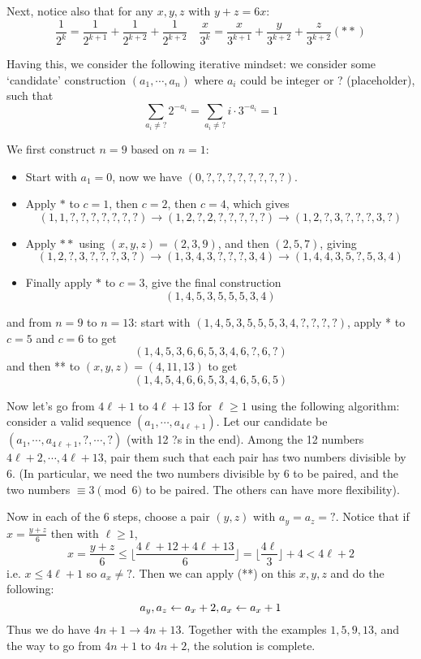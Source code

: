 \documentclass[11pt,a4paper]{article}
\begin{document}
\begin{enumerate}
    Next, notice also that for any $x, y, z$ with $y+z=6x$: 
    \[
    \frac{1}{2^{k}}=\frac{1}{2^{k+1}}+\frac{1}{2^{k+2}}+\frac{1}{2^{k+2}}
    \quad 
    \frac{x}{3^{k}}=\frac{x}{3^{k+1}}+\frac{y}{3^{k+2}}+\frac{z}{3^{k+2}} (**)
    \]
   
    Having this, we consider the following iterative mindset: 
    we consider some `candidate' construction $(a_1, \cdots, a_n)$ where $a_i$ could be integer or ? (placeholder), such that 
    \[
    \sum_{a_i\neq ?} 2^{-a_i}
    =\sum_{a_i\neq ?} i\cdot 3^{-a_i}
    =1
    \]
    
    We first construct $n=9$ based on $n=1$: 
    \begin{itemize}
    	\item Start with $a_1=0$, now we have $(0, ?, ?, ?, ?, ?, ?, ?, ?)$. 
    	
    	\item Apply $*$ to $c=1$, then $c=2$, then $c=4$, which gives 
    	\[
    	(1, 1, ?, ?, ?, ?, ?, ?, ?)
    	\to (1, 2, ?, 2, ?, ?, ?, ?, ?)
    	\to (1, 2, ?, 3, ?, ?, ?, 3, ?)
    	\]
    	\item Apply $**$ using $(x, y, z)=(2,3,9)$, and then $(2,5,7)$, giving 
    	\[
    	(1, 2, ?, 3, ?, ?, ?, 3, ?)
    	\to (1, 3, 4, 3, ?, ?, ?, 3, 4)
    	\to (1, 4, 4, 3, 5, ?, 5, 3, 4)
    	\]
    	\item Finally apply $*$ to $c=3$, give the final construction 
    	\[
    	(1, 4, 5, 3, 5, 5, 5, 3, 4)
    	\]
    \end{itemize}
    and from $n=9$ to $n=13$: 
    start with $(1, 4, 5, 3, 5, 5, 5, 3, 4,?,?,?,?)$, 
    apply * to $c=5$ and $c=6$ to get 
    \[
    (1, 4, 5, 3, 6, 6, 5, 3, 4,6,?,6,?)
    \]
    and then ** to $(x,y,z)=(4,11,13)$ to get 
    \[
    (1, 4, 5, 4, 6, 6, 5, 3, 4,6,5,6,5)
    \]
    
    Now let's go from $4\ell+1$ to $4\ell+13$ for $\ell\ge 1$ using the following algorithm: 
    consider a valid sequence $(a_1, \cdots, a_{4\ell+1})$. 
    Let our candidate be $(a_1, \cdots, a_{4\ell+1}, ?, \cdots, ?)$ (with 12 ?s in the end). 
    Among the 12 numbers $4\ell+2,\cdots, 4\ell+13$, 
    pair them such that each pair has two numbers divisible by 6. 
    (In particular, we need the two numbers divisible by 6 to be paired, and the two numbers $\equiv 3\pmod{6}$ to be paired. The others can have more flexibility). 
    
    Now in each of the 6 steps, choose a pair $(y, z)$ with $a_y=a_z=?$. 
    Notice that if $x=\frac{y+z}{6}$ then with $\ell\ge 1$,
    \[x=\frac{y+z}{6}\le\lfloor\frac{4\ell+12+4\ell+13}{6}\rfloor
    =\lfloor\frac{4\ell}{3}\rfloor+4
    < 4\ell+2
    \]
    i.e. $x\le 4\ell+1$
    so $a_x\neq ?$. 
    Then we can apply (**) on this $x, y, z$ and do the following: 
    \[
    a_y, a_z\leftarrow a_x+2, a_x\leftarrow a_x+1
    \]
    Thus we do have $4n+1\to 4n+13$. Together with the examples $1, 5, 9, 13$, and the way to go from $4n+1$ to $4n+2$, the solution is complete. 
    
	
\end{enumerate}
\end{document}
